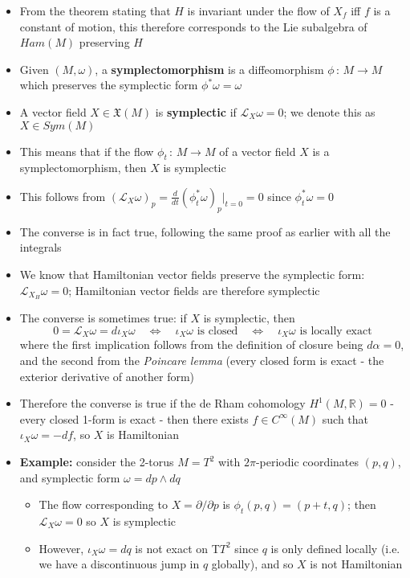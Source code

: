\documentclass[12pt,a4paper]{article}
\numberwithin{equation}{section}
\begin{document}
\begin{itemize}
		\item From the theorem stating that $H$ is invariant under the flow of $X_{f}$ iff $f$ is a constant of motion, this therefore corresponds to the Lie subalgebra of $Ham(M)$ preserving $H$
		\item Given $(M,\omega)$, a \textbf{symplectomorphism} is a diffeomorphism $\phi\,:\,M\to M$ which preserves the symplectic form $\phi^{*}\omega=\omega$
		\item A vector field $X\in\mathfrak{X}(M)$ is \textbf{symplectic} if $\mathcal{L}_{X}\omega =0$; we denote this as $X\in Sym(M)$
		\item This means that if the flow $\phi_{t}\,:\,M\to M$ of a vector field $X$ is a symplectomorphism, then $X$ is symplectic
		\item This follows from $(\mathcal{L}_{X}\omega)_{p}=\frac{d}{dt}(\phi_{t}^{*}\omega)_{p}\rvert_{t=0}=0$ since $\phi_{t}^{*}\omega=0$
		\item The converse is in fact true, following the same proof as earlier with all the integrals
		\item We know that Hamiltonian vector fields preserve the symplectic form: $\mathcal{L}_{X_{H}}\omega=0$; Hamiltonian vector fields are therefore symplectic
		\item The converse is sometimes true: if $X$ is symplectic, then
		\begin{equation}
			0=\mathcal{L}_{X}\omega=d\iota_{X}\omega\quad\iff\quad \iota_{X}\omega\text{ is closed}\quad\iff\quad \iota_{X}\omega \text{ is locally exact}
		\end{equation}
		where the first implication follows from the definition of closure being $d\alpha=0$, and the second from the \textit{Poincare lemma} (every closed form is exact - the exterior derivative of another form)
		\item Therefore the converse is true if the de Rham cohomology $H^{1}(M,\mathbb{R})=0$ - every closed 1-form is exact - then there exists $f\in C^{\infty}(M)$ such that $\iota_{X}\omega=-df$, so $X$ is Hamiltonian
		\item \textbf{Example:} consider the 2-torus $M=T^{2}$ with $2\pi$-periodic coordinates $(p,q)$, and symplectic form $\omega=dp\wedge dq$
		\begin{itemize}
			\item The flow corresponding to $X=\partial/\partial p$ is $\phi_{t}(p,q)=(p+t,q)$; then $\mathcal{L}_{X}\omega=0$ so $X$ is symplectic
			\item However, $\iota_{X}\omega=dq$ is not exact on T$T^{2}$ since $q$ is only defined locally (i.e. we have a discontinuous jump in $q$ globally), and so $X$ is not Hamiltonian

\end{itemize}
\end{itemize}
\end{document}
